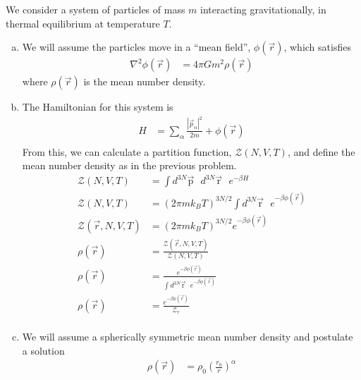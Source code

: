 \documentclass[]{book}
\begin{document}
\begin{enumerate}[1)]
We consider a system of particles of mass $m$ interacting gravitationally, in thermal equilibrium at temperature $T$. \\
\begin{enumerate}[a)]
\item We will assume the particles move in a ``mean field'', $\phi(\vec{r})$, which satisfies
\begin{equation}
\begin{split}
\nabla^2\phi(\vec{r}) & = 4\pi Gm^2 \rho(\vec{r})
\end{split}
\end{equation}
where $\rho(\vec{r})$ is the mean number density.
\item The Hamiltonian for this system is
\begin{equation}
\begin{split}
H & = \sum_\alpha \frac{|\vec{p}_\alpha|^2}{2m} + \phi(\vec{r}) \\
\end{split}
\end{equation}
From this, we can calculate a partition function, $\mathcal{Z}(N,V,T)$, and define the mean number density as in the previous problem. 
\begin{equation}
\begin{split}
\mathcal{Z}(N,V,T) & = \int d^{3N}\vec{\text{p}} \text{ } d^{3N}\vec{\text{r}} \text{ } e^{-\beta H} \\
\mathcal{Z}(N,V,T) & = (2\pi m k_B T)^{3N/2} \int   d^{3N}\vec{\text{r}} \text{ } e^{-\beta \phi(\vec{r})}\\
\mathcal{Z}(\vec{r}, N,V,T) & = (2\pi m k_B T)^{3N/2} e^{-\beta \phi(\vec{r})}\\
\rho(\vec{r}) & = \frac{\mathcal{Z}(\vec{r},N,V,T)}{\mathcal{Z}(N,V,T)}\\
\rho(\vec{r}) & = \frac{e^{-\beta \phi(\vec{r})} }{\int d^{3N}\vec{\text{r}} \text{ } e^{-\beta \phi(\vec{r})}}\\
\rho(\vec{r}) & = \frac{e^{-\beta \phi(\vec{r})} }{ \mathcal{Z}_r}\\
\end{split}
\end{equation}
\item
We will assume a spherically symmetric mean number density and postulate a solution
\begin{equation}
\begin{split}
\rho(\vec{r}) & = \rho_0 \left(\frac{r_0}{r} \right)^\alpha \\
\end{split}

\end{equation}
\end{enumerate}
\end{enumerate}
\end{document}
